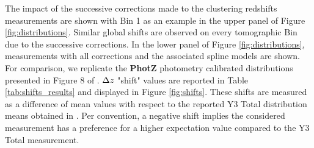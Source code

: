 The impact of the successive corrections made to the clustering redshifts measurements are shown with Bin 1 as an example in the upper panel of Figure \ref{fig:distributions}. 
Similar global shifts are observed on every tomographic Bin due to the successive corrections. 
In the lower panel of Figure \ref{fig:distributions}, measurements with all corrections and the associated spline models are shown. 
For comparison, we replicate the \textbf{PhotZ} photometry calibrated distributions presented in Figure 8 of \cite{HSCClusteringRau2023}. $\Delta z$ "shift" values are reported in Table \ref{tab:shifts_results} and displayed in Figure \ref{fig:shifts}. These shifts are measured as a difference of mean values with respect to the reported Y3 Total distribution means obtained in \cite{HSCClusteringRau2023}. Per convention, a negative shift implies the considered measurement has a preference for a higher expectation value compared to the Y3 Total measurement.  
